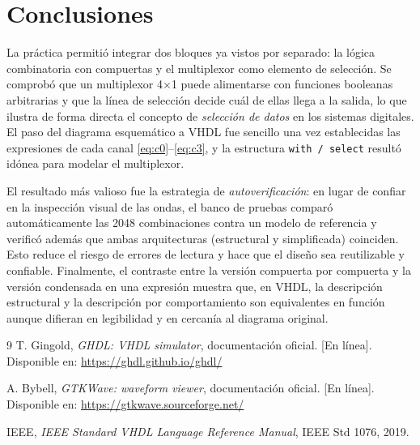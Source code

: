 \documentclass[12pt,a4paper]{article}
\begin{document}
\section{Conclusiones}

La práctica permitió integrar dos bloques ya vistos por separado: la lógica
combinatoria con compuertas y el multiplexor como elemento de selección. Se
comprobó que un multiplexor 4$\times$1 puede alimentarse con funciones
booleanas arbitrarias y que la línea de selección decide cuál de ellas llega a
la salida, lo que ilustra de forma directa el concepto de \emph{selección de
datos} en los sistemas digitales. El paso del diagrama esquemático a VHDL fue
sencillo una vez establecidas las expresiones de cada canal
\eqref{eq:c0}--\eqref{eq:c3}, y la estructura \texttt{with~/~select} resultó
idónea para modelar el multiplexor.

El resultado más valioso fue la estrategia de \emph{autoverificación}: en lugar
de confiar en la inspección visual de las ondas, el banco de pruebas comparó
automáticamente las 2048 combinaciones contra un modelo de referencia y
verificó además que ambas arquitecturas (estructural y simplificada) coinciden.
Esto reduce el riesgo de errores de lectura y hace que el diseño sea
reutilizable y confiable. Finalmente, el contraste entre la versión
compuerta por compuerta y la versión condensada en una expresión muestra que,
en VHDL, la descripción estructural y la descripción por comportamiento son
equivalentes en función aunque difieran en legibilidad y en cercanía al
diagrama original.

\begin{thebibliography}{9}
    T. Gingold, \textit{GHDL: VHDL simulator}, documentación oficial.
    [En línea]. Disponible en: \url{https://ghdl.github.io/ghdl/}

    A. Bybell, \textit{GTKWave: waveform viewer}, documentación oficial.
    [En línea]. Disponible en: \url{https://gtkwave.sourceforge.net/}

    IEEE, \textit{IEEE Standard VHDL Language Reference Manual},
    IEEE Std 1076, 2019.
\end{thebibliography}
\end{document}
